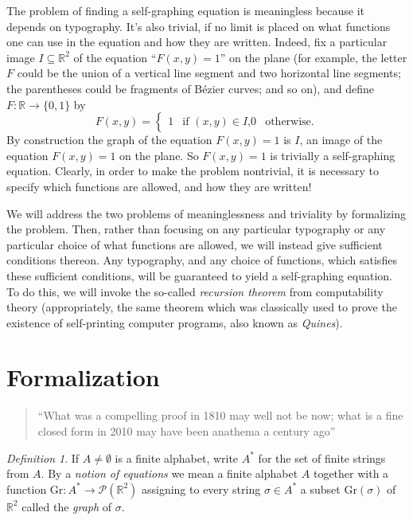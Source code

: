 \documentclass[table, svgnames, dvipsnames, letterpaper, 11pt]{report}
\theoremstyle{remark}
\newtheorem{definition}[theorem]{Definition}
\def\\{}%
\begin{document}
The problem of finding a self-graphing equation is meaningless because
it depends on typography. It's also trivial, if no limit is placed on
what functions one can use in the equation and how they are written.
Indeed, fix a particular image $I\subseteq\mathbb R^2$ of the equation
``$F(x,y)=1$'' on the plane (for example, the letter $F$ could be the union
of a vertical line segment and two horizontal line segments; the
parentheses could be fragments of B\'ezier curves; and so on),
and define $F:\mathbb R\to\{0,1\}$ by
\[
  F(x,y)
  =
  \begin{cases}
    1 &\mbox{if $(x,y)\in I$,}\\
    0 &\mbox{otherwise.}
  \end{cases}
\]
By construction the graph of the equation $F(x,y)=1$ is $I$, an image
of the equation $F(x,y)=1$ on the plane. So $F(x,y)=1$ is trivially a
self-graphing equation. Clearly, in order to make the problem nontrivial,
it is necessary to specify which functions are allowed, and how they are
written!

We will address the two problems of meaninglessness and triviality by
formalizing the problem. Then, rather than focusing on any particular
typography or any particular choice of what functions are allowed,
we will instead give sufficient conditions thereon. Any typography, and
any choice of functions, which satisfies these sufficient conditions,
will be guaranteed to yield a self-graphing equation. To do this, we will
invoke the so-called \emph{recursion theorem} from computability theory
(appropriately, the same theorem which was classically used to prove the
existence of self-printing computer programs, also known as \emph{Quines}).

\section{Formalization}

\begin{quote}
  ``What was a compelling proof in 1810 may well not be now;
  what is a fine closed form in 2010 may have been anathema a century
  ago'' \cite{borwein2013closed}
\end{quote}

\begin{definition}
  If $A\not=\emptyset$ is a finite
  alphabet, write $A^*$ for
  the set of finite strings
  from $A$. By a \emph{notion
  of equations} we mean a finite
  alphabet $A$ together with a
  function
  $\mathrm{Gr}:A^*
  \to\mathscr P(\mathbb R^2)$
  assigning to every string
  $\sigma\in A^*$ a subset
  $\mathrm{Gr}(\sigma)$ of $\mathbb R^2$
  called the \emph{graph} of $\sigma$.
\end{definition}
\end{document}
